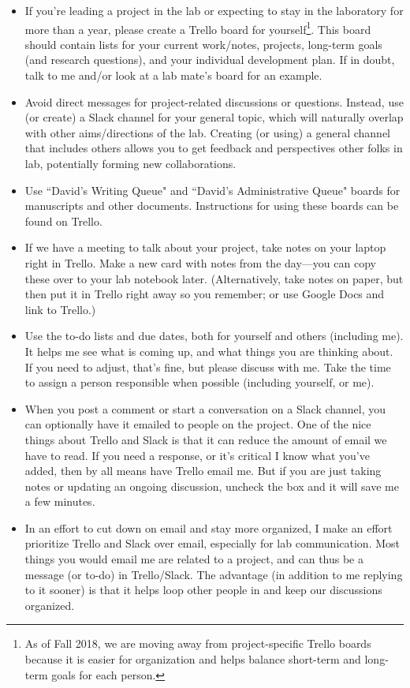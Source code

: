 \documentclass[letterpaper,12pt,oneside]{memoir}
\begin{document}
\begin{itemize}
\item If you're leading a project in the lab or expecting to stay in the laboratory for more than a year, please create a Trello board for yourself\footnote{As of Fall 2018, we are moving away from project-specific Trello boards because it is easier for organization and helps balance short-term and long-term goals for each person.}. This board should contain lists for your current work/notes, projects, long-term goals (and research questions), and your individual development plan. If in doubt, talk to me and/or look at a lab mate's board for an example.

\item Avoid direct messages for project-related discussions or questions. Instead, use (or create) a Slack channel for your general topic, which will naturally overlap with other aims/directions of the lab. Creating (or using) a general channel that includes others allows you to get feedback and perspectives other folks in lab, potentially forming new collaborations.

\item Use ``David's Writing Queue" and ``David's Administrative Queue" boards for manuscripts and other documents. Instructions for using these boards can be found on Trello.

\item If we have a meeting to talk about your project, take notes on your laptop right in Trello. Make a new card with notes from the day---you can copy these over to your lab notebook later. (Alternatively, take notes on paper, but then put it in Trello right away so you remember; or use Google Docs and link to Trello.)

\item Use the to-do lists and due dates, both for yourself and others (including me). It helps me see what is coming up, and what things you are thinking about. If you need to adjust, that's fine, but please discuss with me. Take the time to assign a person responsible when possible (including yourself, or me).

\item When you post a comment or start a conversation on a Slack channel, you can optionally have it emailed to people on the project. One of the nice things about Trello and Slack is that it can reduce the amount of email we have to read. If you need a response, or it's critical I know what you've added, then by all means have Trello email me. But if you are just taking notes or updating an ongoing discussion, uncheck the box and it will save me a few minutes.

\item In an effort to cut down on email and stay more organized, I make an effort prioritize Trello and Slack over email, especially for lab communication. Most things you would email me are related to a project, and can thus be a message (or to-do) in Trello/Slack. The advantage (in addition to me replying to it sooner) is that it helps loop other people in and keep our discussions organized. 

\end{itemize}
\end{document}
